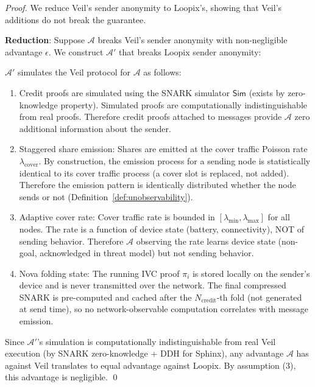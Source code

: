 \documentclass[11pt,a4paper]{article}
\newcommand{\Adv}{\mathcal{A}}
\begin{document}
\begin{proof}
We reduce Veil's sender anonymity to Loopix's, showing that Veil's additions do not break the guarantee.

\textbf{Reduction}: Suppose $\Adv$ breaks Veil's sender anonymity with non-negligible advantage $\epsilon$. We construct $\Adv'$ that breaks Loopix sender anonymity:

$\Adv'$ simulates the Veil protocol for $\Adv$ as follows:
\begin{enumerate}[nosep]
    \item Credit proofs are simulated using the SNARK simulator $\mathsf{Sim}$ (exists by zero-knowledge property). Simulated proofs are computationally indistinguishable from real proofs. Therefore credit proofs attached to messages provide $\Adv$ zero additional information about the sender.

    \item Staggered share emission: Shares are emitted at the cover traffic Poisson rate $\lambda_{\text{cover}}$. By construction, the emission process for a sending node is statistically identical to its cover traffic process (a cover slot is replaced, not added). Therefore the emission pattern is identically distributed whether the node sends or not (Definition~\ref{def:unobservability}).

    \item Adaptive cover rate: Cover traffic rate is bounded in $[\lambda_{\min}, \lambda_{\max}]$ for all nodes. The rate is a function of device state (battery, connectivity), NOT of sending behavior. Therefore $\Adv$ observing the rate learns device state (non-goal, acknowledged in threat model) but not sending behavior.

    \item Nova folding state: The running IVC proof $\pi_i$ is stored locally on the sender's device and is never transmitted over the network. The final compressed SNARK is pre-computed and cached after the $N_{\text{credit}}$-th fold (not generated at send time), so no network-observable computation correlates with message emission.
\end{enumerate}

Since $\Adv'$'s simulation is computationally indistinguishable from real Veil execution (by SNARK zero-knowledge + DDH for Sphinx), any advantage $\Adv$ has against Veil translates to equal advantage against Loopix. By assumption (3), this advantage is negligible. \qed
\end{proof}
\end{document}
